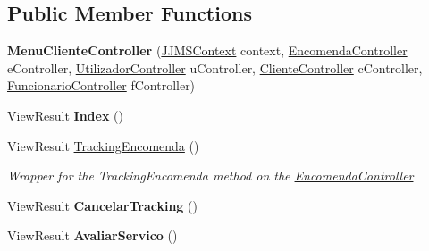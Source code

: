 \subsection*{Public Member Functions}
\begin{DoxyCompactItemize}
\item 
\mbox{\label{classmvc_j_j_m_s_1_1_controllers_1_1_menu_cliente_controller_a255074854d91d443c60f47991a493d03}} 
{\bfseries Menu\+Cliente\+Controller} (\mbox{\hyperlink{classmvc_j_j_m_s_1_1_data_1_1_j_j_m_s_context}{J\+J\+M\+S\+Context}} context, \mbox{\hyperlink{classmvc_j_j_m_s_1_1_controllers_1_1_encomenda_controller}{Encomenda\+Controller}} e\+Controller, \mbox{\hyperlink{classmvc_j_j_m_s_1_1_controllers_1_1_utilizador_controller}{Utilizador\+Controller}} u\+Controller, \mbox{\hyperlink{classmvc_j_j_m_s_1_1_controllers_1_1_cliente_controller}{Cliente\+Controller}} c\+Controller, \mbox{\hyperlink{classmvc_j_j_m_s_1_1_controllers_1_1_funcionario_controller}{Funcionario\+Controller}} f\+Controller)
\item 
\mbox{\label{classmvc_j_j_m_s_1_1_controllers_1_1_menu_cliente_controller_a60f79627774e8151c0d87dd1971ca3ae}} 
View\+Result {\bfseries Index} ()
\item 
View\+Result \mbox{\hyperlink{classmvc_j_j_m_s_1_1_controllers_1_1_menu_cliente_controller_abfae9a2d4e35be83a5baf81cb906d41e}{Tracking\+Encomenda}} ()
\begin{DoxyCompactList}\small\item\em Wrapper for the Tracking\+Encomenda method on the \mbox{\hyperlink{classmvc_j_j_m_s_1_1_controllers_1_1_encomenda_controller}{Encomenda\+Controller}} \end{DoxyCompactList}\item 
\mbox{\label{classmvc_j_j_m_s_1_1_controllers_1_1_menu_cliente_controller_aac2a018e346fbc50fc186d672e04ac32}} 
View\+Result {\bfseries Cancelar\+Tracking} ()
\item 
\mbox{\label{classmvc_j_j_m_s_1_1_controllers_1_1_menu_cliente_controller_a939a097483e0d3ccfab5dc33809630c6}} 
View\+Result {\bfseries Avaliar\+Servico} ()
\item 

\end{DoxyCompactItemize}
